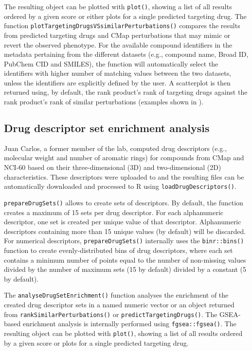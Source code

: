 The resulting object can be plotted with \texttt{plot()}, showing a list of all results ordered by a given score or either plots for a single predicted targeting drug. The function \texttt{plotTargetingDrugsVSsimilarPerturbations()} compares the results from predicted targeting drugs and CMap perturbations that may mimic or revert the observed phenotype. For the available compound identifiers in the metadata pertaining from the different datasets (e.g., compound name, Broad ID, PubChem CID and SMILES), the function will automatically select the identifiers with higher number of matching values between the two datasets, unless the identifiers are explicitly defined by the user. A scatterplot is then returned using, by default, the rank product’s rank of targeting drugs against the rank product’s rank of similar perturbations (examples shown in ).

\subsection{Drug descriptor set enrichment analysis}
\label{subsec:descriptor-set-enrichment}

Juan Carlos, a former member of the lab, computed drug descriptors (e.g., molecu\-lar weight and number of aromatic rings) for compounds from CMap and NCI-60 based on their three-dimensional (3D) and two-dimensional (2D) characteristics. These descriptors were uploaded to  and the resulting files can be automatically downloaded and processed to R using \texttt{loadDrugDescriptors()}.

\texttt{prepareDrugSets()} allows to create sets of descriptors. By default, the function creates a maximum of 15 sets per drug descriptor. For each alphanumeric descriptor, one set is created per unique value of that descriptor. Alphanumeric descriptors containing more than 15 unique values (by default) will be discarded. For numerical descriptors, \texttt{prepareDrugSets()} internally uses the \texttt{binr::bins()} function to create evenly-distributed bins of drug descriptors, where each set contains a minimum number of points equal to the number of non-missing values divided by the number of maximum sets (15 by default) divided by a constant (5 by default).

The \texttt{analyseDrugSetEnrichment()} function analyses the enrichment of the created drug descriptor sets in a named numeric vector or an object returned from \texttt{rankSimilarPerturbations()} or \texttt{predictTargetingDrugs()}. The GSEA-based enrichment analysis is internally performed using \texttt{fgsea::fgsea()}. The resulting object can be plotted with \texttt{plot()}, showing a list of all results ordered by a given score or plots for a single predicted targeting drug.

